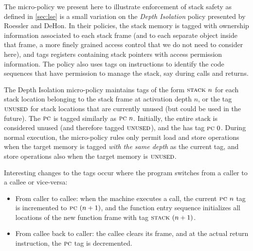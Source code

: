 \documentclass[10pt,conference]{ieeetran}%
\theoremstyle{definition}
\begin{document}
{The micro-policy we present here to illustrate enforcement of stack
safety as defined in \cref{sec:lse} is a small variation
on the {\em Depth Isolation} policy presented by
Roessler and DeHon\cite{DBLP:conf/sp/RoesslerD18}. In their policies,  the stack memory is tagged
with ownership information associated to each stack frame (and to each
separate object inside that frame, a more finely grained access
control that we do not need to consider here), and tags registers containing
stack pointers with access permission information. The policy also
uses tags on instructions to identify the code
sequences that have permission to manage the stack, say during calls and returns.

The Depth Isolation micro-policy maintains tags of the form $\textsc{stack} ~ n$ for
each stack location belonging to the stack frame at activation depth
$n$, or the tag $\textsc{unused}$ for stack locations that are currently
unused (but could be used in the future).
%
The $\textsc{pc}$ is tagged similarly as $\textsc{pc} ~ n$.
%
Initially, the entire stack is considered unused (and therefore tagged
$\textsc{unused}$), and the {\PCname} has tag $\textsc{pc} ~ 0$.
%
During normal execution, the micro-policy rules only permit load and
store operations when the target memory is tagged {\em with the same
  depth} as the current {\PCname} tag, and store operations also when the
target memory is $\textsc{unused}$.

Interesting changes to the tags occur where the program switches from
a caller to a callee or vice-versa:

\begin{itemize}

\item From caller to callee: when the machine executes a call,
  the current
  $\textsc{pc} ~ n$ tag is incremented to $\textsc{pc} ~ (n + 1)$, and the function
  entry sequence initializes  all locations of the new function frame with
  tag $\textsc{stack} ~ (n + 1)$.

\item From callee back to caller: the callee clears its frame, and at
  the actual return instruction,
  the $\textsc{pc}$ tag is decremented.


\end{itemize}}
\end{document}
